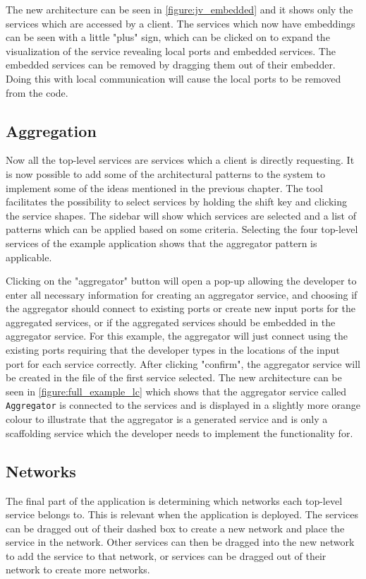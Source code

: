 The new architecture can be seen in \cref{figure:jv_embedded} and it shows only the services which are accessed by a client. The services which now have embeddings can be seen with a little "plus" sign, which can be clicked on to expand the visualization of the service revealing local ports and embedded services.
The embedded services can be removed by dragging them out of their embedder. Doing this with local communication will cause the local ports to be removed from the code.

\subsection{Aggregation}
Now all the top-level services are services which a client is directly requesting. It is now possible to add some of the architectural patterns to the system to implement some of the ideas mentioned in the previous chapter.
The tool facilitates the possibility to select services by holding the shift key and clicking the service shapes. The sidebar will show which services are selected and a list of patterns which can be applied based on some
criteria. Selecting the four top-level services of the example application shows that the aggregator pattern is applicable.

Clicking on the "aggregator" button will open a pop-up allowing the developer to enter all necessary information for creating an aggregator service, and choosing if the aggregator should connect to existing ports or create new input ports for the aggregated services, or if the aggregated services should be embedded in the aggregator service.
For this example, the aggregator will just connect using the existing ports requiring that the developer types in the locations of the input port for each service correctly.
After clicking "confirm", the aggregator service will be created in the file of the first service selected. The new architecture can be seen in \cref{figure:full_example_lc} which shows that the aggregator service called \texttt{Aggregator} is connected to the services and is displayed in a slightly more orange colour 
to illustrate that the aggregator is a generated service and is only a scaffolding service which the developer needs to implement the functionality for.

\subsection{Networks}
The final part of the application is determining which networks each top-level service belongs to. This is relevant when the application is deployed.
The services can be dragged out of their dashed box to create a new network and place the service in the network.
Other services can then be dragged into the new network to add the service to that network, or services can be dragged out of their network to create more networks.

